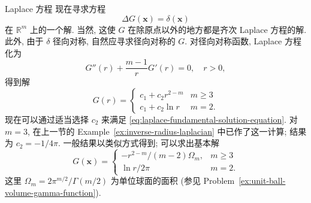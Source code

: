 \begin{Example}{Laplace 方程}
\label{ex:laplace-fundamental-solution}
现在寻求方程
\begin{equation}\label{eq:laplace-fundamental-solution-equation}
\Delta G(\bm{x})=\delta(\bm{x})
\end{equation}
在 $\mathbb{R}^m$ 上的一个解. 当然, 这使 $G$ 在除原点以外的地方都是齐次 Laplace 方程的解. 此外, 由于 $\delta$ 径向对称, 自然应寻求径向对称的 $G$. 对径向对称函数, Laplace 方程化为
\begin{equation}\label{eq:laplace-radial-fundamental-ode}
G''(r)+\dfrac{m-1}rG'(r)=0,\quad r>0,
\end{equation}
得到解
\begin{equation}\label{eq:laplace-radial-homogeneous-solutions}
G(r)=\begin{cases}c_1+c_2r^{2-m}&m\geq3\\c_1+c_2\ln r&m=2.\end{cases}
\end{equation}
现在可以通过适当选择 $c_2$ 来满足 \eqref{eq:laplace-fundamental-solution-equation}. 对 $m=3$, 在上一节的 Example~\ref{ex:inverse-radius-laplacian} 中已作了这一计算; 结果为 $c_2=-1/4\pi$. 一般结果以类似方式得到; 可以求出基本解
\begin{equation}\label{eq:laplace-fundamental-solution-all-dimensions}
G(\bm{x})=\begin{cases}-r^{2-m}/(m-2)\Omega_m,&m\geq3\\\ln r/2\pi&m=2.\end{cases}
\end{equation}
这里 $\Omega_m=2\pi^{m/2}/\Gamma(m/2)$ 为单位球面的面积 (参见 Problem~\ref{ex:unit-ball-volume-gamma-function}).
\end{Example}
